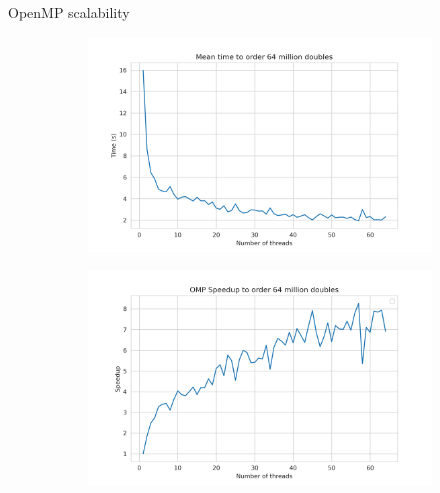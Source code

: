 \documentclass[11pt]{beamer}
\begin{document}
\begin{frame}{OpenMP scalability}
	\begin{figure}[h]
		\centering
		\begin{subfigure}{0.75\textwidth}
			\centering
			\includegraphics[width=0.5\linewidth]{../exercise2/plots/omp_timings}
			\label{fig:omptimings}
		\end{subfigure}
		\begin{subfigure}{0.75\textwidth}
			\centering
			\includegraphics[width=0.7\linewidth]{../exercise2/plots/omp_speedup}
			\label{fig:ompspeedup}
		\end{subfigure}
	\end{figure}
\end{frame}
\end{document}
